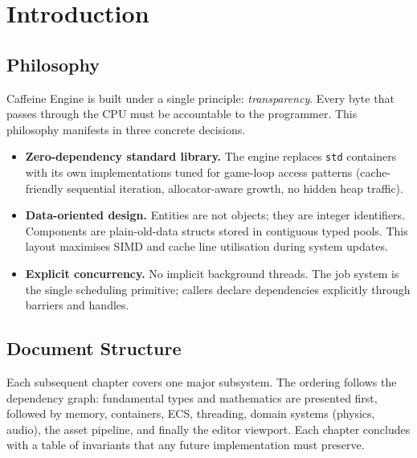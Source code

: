 \chapter{Introduction}

\section{Philosophy}

Caffeine Engine is built under a single principle: \emph{transparency}.
Every byte that passes through the CPU must be accountable to the
programmer. This philosophy manifests in three concrete decisions.

\begin{itemize}[leftmargin=1.5em]
  \item \textbf{Zero-dependency standard library.} The engine replaces
        \texttt{std} containers with its own implementations tuned for
        game-loop access patterns (cache-friendly sequential iteration,
        allocator-aware growth, no hidden heap traffic).

  \item \textbf{Data-oriented design.} Entities are not objects; they are
        integer identifiers. Components are plain-old-data structs stored in
        contiguous typed pools. This layout maximises SIMD and cache line
        utilisation during system updates.

  \item \textbf{Explicit concurrency.} No implicit background threads.
        The job system is the single scheduling primitive; callers declare
        dependencies explicitly through barriers and handles.
\end{itemize}

\section{Document Structure}

Each subsequent chapter covers one major subsystem. The ordering follows
the dependency graph: fundamental types and mathematics are presented first,
followed by memory, containers, ECS, threading, domain systems (physics,
audio), the asset pipeline, and finally the editor viewport. Each chapter
concludes with a table of invariants that any future implementation must
preserve.

